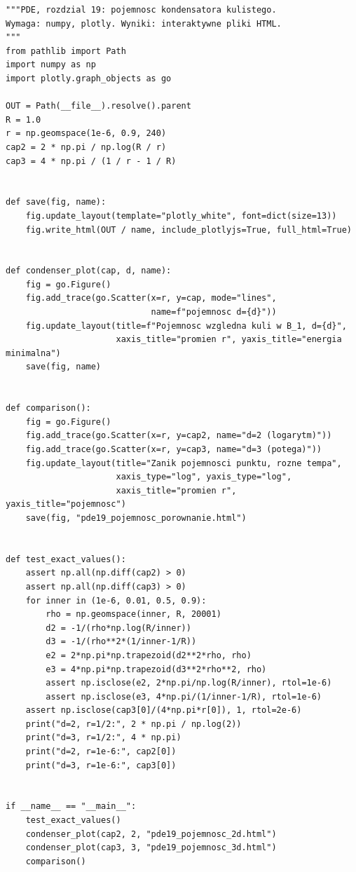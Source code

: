 \begin{lstlisting}[style=pythonpde,caption={Pojemność Sobolewa i tempo zaniku pojemności punktu (Plotly)},label={code:pde19-plotly}]
"""PDE, rozdzial 19: pojemnosc kondensatora kulistego.
Wymaga: numpy, plotly. Wyniki: interaktywne pliki HTML.
"""
from pathlib import Path
import numpy as np
import plotly.graph_objects as go

OUT = Path(__file__).resolve().parent
R = 1.0
r = np.geomspace(1e-6, 0.9, 240)
cap2 = 2 * np.pi / np.log(R / r)
cap3 = 4 * np.pi / (1 / r - 1 / R)


def save(fig, name):
    fig.update_layout(template="plotly_white", font=dict(size=13))
    fig.write_html(OUT / name, include_plotlyjs=True, full_html=True)


def condenser_plot(cap, d, name):
    fig = go.Figure()
    fig.add_trace(go.Scatter(x=r, y=cap, mode="lines",
                             name=f"pojemnosc d={d}"))
    fig.update_layout(title=f"Pojemnosc wzgledna kuli w B_1, d={d}",
                      xaxis_title="promien r", yaxis_title="energia minimalna")
    save(fig, name)


def comparison():
    fig = go.Figure()
    fig.add_trace(go.Scatter(x=r, y=cap2, name="d=2 (logarytm)"))
    fig.add_trace(go.Scatter(x=r, y=cap3, name="d=3 (potega)"))
    fig.update_layout(title="Zanik pojemnosci punktu, rozne tempa",
                      xaxis_type="log", yaxis_type="log",
                      xaxis_title="promien r", yaxis_title="pojemnosc")
    save(fig, "pde19_pojemnosc_porownanie.html")


def test_exact_values():
    assert np.all(np.diff(cap2) > 0)
    assert np.all(np.diff(cap3) > 0)
    for inner in (1e-6, 0.01, 0.5, 0.9):
        rho = np.geomspace(inner, R, 20001)
        d2 = -1/(rho*np.log(R/inner))
        d3 = -1/(rho**2*(1/inner-1/R))
        e2 = 2*np.pi*np.trapezoid(d2**2*rho, rho)
        e3 = 4*np.pi*np.trapezoid(d3**2*rho**2, rho)
        assert np.isclose(e2, 2*np.pi/np.log(R/inner), rtol=1e-6)
        assert np.isclose(e3, 4*np.pi/(1/inner-1/R), rtol=1e-6)
    assert np.isclose(cap3[0]/(4*np.pi*r[0]), 1, rtol=2e-6)
    print("d=2, r=1/2:", 2 * np.pi / np.log(2))
    print("d=3, r=1/2:", 4 * np.pi)
    print("d=2, r=1e-6:", cap2[0])
    print("d=3, r=1e-6:", cap3[0])


if __name__ == "__main__":
    test_exact_values()
    condenser_plot(cap2, 2, "pde19_pojemnosc_2d.html")
    condenser_plot(cap3, 3, "pde19_pojemnosc_3d.html")
    comparison()
\end{lstlisting}


